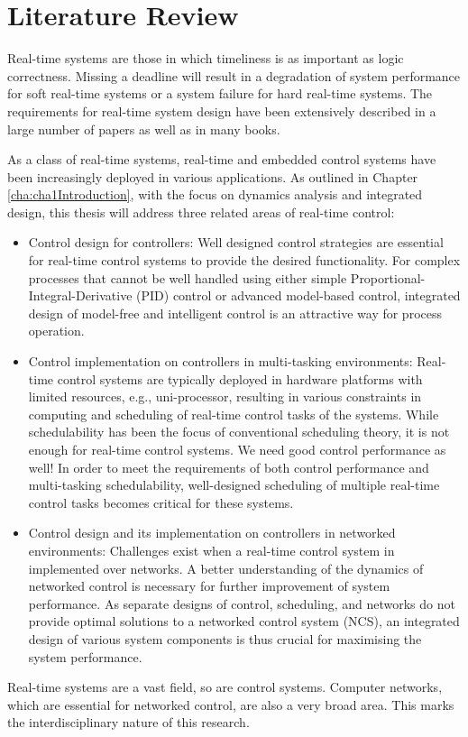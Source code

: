 
\chapter[Literature Review]{Literature Review}
\label{cha:cha2LiteratureReview}

Real-time systems are those in which timeliness is as important as logic correctness. Missing a deadline will result in a degradation of system performance for soft real-time systems or a system failure for
hard real-time systems. The requirements for real-time system design have been extensively described in a large number of papers as well as in many books. 

As a class of real-time systems, real-time and embedded control systems have been increasingly deployed in various applications. As outlined in Chapter \ref{cha:cha1Introduction}, with the focus on dynamics analysis and integrated design, this thesis will address three related areas of real-time control:
\begin{itemize} 
\baselineskip
\item Control design for controllers: Well designed control strategies are essential for real-time control systems to provide the desired functionality. For complex processes that cannot be well handled using either simple Proportional-Integral-Derivative (PID) control or advanced model-based control, integrated design of model-free and intelligent control is an attractive way for process operation. 

\item Control implementation on controllers in multi-tasking environments: Real-time control systems are typically deployed in hardware platforms with limited resources, e.g., uni-processor, resulting in various constraints in computing and scheduling of real-time control tasks of the systems. While schedulability has been the focus of conventional scheduling theory, it is not enough for real-time control systems. We need good control performance as well! In order to meet the requirements of both control performance and multi-tasking schedulability, well-designed scheduling of multiple real-time control tasks becomes critical for these systems. 

\item Control design and its implementation on controllers in networked environments: Challenges exist when a real-time control system in implemented over networks. A better understanding of the dynamics of networked control is necessary for further improvement of system performance. As separate designs of control, scheduling, and networks do not provide optimal solutions to a networked control system (NCS), an integrated design of various system components is thus crucial for maximising the system performance. 
\end{itemize}
%

Real-time systems are a vast field, so are control systems. Computer networks, which are essential for networked control, are also a very broad area. This marks the interdisciplinary nature of this research. 